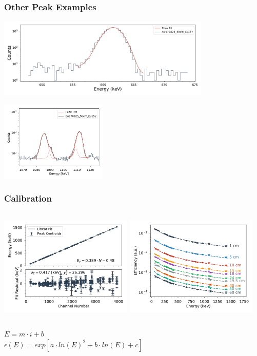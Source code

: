 \documentclass[12pt,xcolor=dvipsnames]{beamer}
\begin{document}
\begin{frame}
\frametitle{Other Peak Examples}
\centering
\includegraphics[width=4.0in]{peak_fits/AV170825_50cm_Cs137_fits}

\includegraphics[width=2.0in]{Eu_Peaks.png}

\end{frame}

\begin{frame}
\frametitle{Calibration}
\begin{columns}[c]
\column{2.5in}
\includegraphics[width=2.5in]{calibration/energy_calibration}
\column{2.5in}
\includegraphics[width=2.5in]{calibration/efficiency_calibration}
\end{columns}
$E = m\cdot i+b$
\ \ \\
$\epsilon (E) = exp[a\cdot ln(E)^2+b\cdot ln(E)+c]$

\end{frame}
\end{document}

